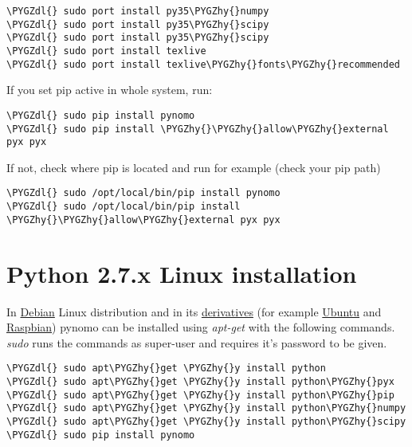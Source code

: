 \documentclass[a4paper,11pt,english]{sphinxmanual}
\def\PYGZdl{\char`\$}
\def\PYGZhy{\char`\-}
\begin{document}
\begin{Verbatim}[commandchars=\\\{\},formatcom=\scriptsize]
\PYGZdl{} sudo port install py35\PYGZhy{}numpy
\PYGZdl{} sudo port install py35\PYGZhy{}scipy
\PYGZdl{} sudo port install py35\PYGZhy{}scipy
\PYGZdl{} sudo port install texlive
\PYGZdl{} sudo port install texlive\PYGZhy{}fonts\PYGZhy{}recommended
\end{Verbatim}

If you set pip active in whole system, run:

\begin{Verbatim}[commandchars=\\\{\},formatcom=\scriptsize]
\PYGZdl{} sudo pip install pynomo
\PYGZdl{} sudo pip install \PYGZhy{}\PYGZhy{}allow\PYGZhy{}external pyx pyx
\end{Verbatim}

If not, check where pip is located and run for example (check your pip path)

\begin{Verbatim}[commandchars=\\\{\},formatcom=\scriptsize]
\PYGZdl{} sudo /opt/local/bin/pip install pynomo
\PYGZdl{} sudo /opt/local/bin/pip install \PYGZhy{}\PYGZhy{}allow\PYGZhy{}external pyx pyx
\end{Verbatim}


\section{Python 2.7.x Linux installation}
\label{installation/installation:python-2-7-x-linux-installation}
In \href{https://www.debian.org}{Debian}
Linux distribution and in its \href{https://en.wikipedia.org/wiki/List\_of\_Linux\_distributions}{derivatives} (for example \href{http://ubuntu.com/}{Ubuntu}  and \href{https://www.raspbian.org}{Raspbian}) pynomo can be installed using \emph{apt-get} with the following commands.
\emph{sudo} runs the commands as super-user and requires it's password to be given.

\begin{Verbatim}[commandchars=\\\{\},formatcom=\scriptsize]
\PYGZdl{} sudo apt\PYGZhy{}get \PYGZhy{}y install python
\PYGZdl{} sudo apt\PYGZhy{}get \PYGZhy{}y install python\PYGZhy{}pyx
\PYGZdl{} sudo apt\PYGZhy{}get \PYGZhy{}y install python\PYGZhy{}pip
\PYGZdl{} sudo apt\PYGZhy{}get \PYGZhy{}y install python\PYGZhy{}numpy
\PYGZdl{} sudo apt\PYGZhy{}get \PYGZhy{}y install python\PYGZhy{}scipy
\PYGZdl{} sudo pip install pynomo
\end{Verbatim}
\end{document}
